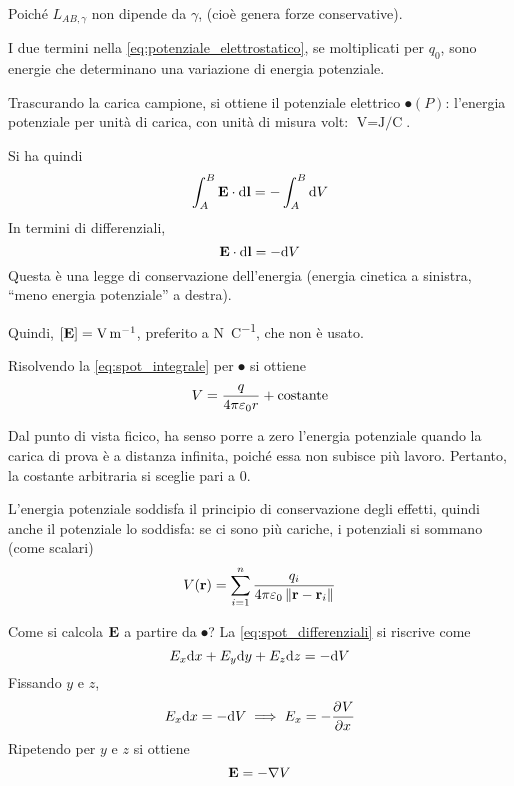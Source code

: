 Poiché $L_{AB,\gamma}$ non dipende da $\gamma$,  (cioè genera forze conservative).

I due termini nella \eqref{eq:potenziale_elettrostatico}, se moltiplicati per $q_0$, sono energie che determinano una variazione di energia potenziale.

Trascurando la carica campione, si ottiene il potenziale elettrico $\spot(P)$: l'energia potenziale per unità di carica, con unità di misura volt: $\unit{\volt} = \unit{\joule\per\coulomb}$.

Si ha quindi
\begin{equation}
\label{eq:spot_integrale}
    \int_A^B \mathbf{E} \cdot \mathrm{d} \mathbf{l} = -\int_A^B \mathrm{d} V
\end{equation}
In termini di differenziali,
\begin{equation}
\label{eq:spot_differenziali}
    \mathbf{E} \cdot \mathrm{d} \mathbf{l} = - \mathrm{d} V
\end{equation}
Questa è una legge di conservazione dell'energia (energia cinetica a sinistra, ``meno energia potenziale'' a destra).

Quindi, $[\E] = \unit{\volt\per\metre}$, preferito a \unit{\newton\per\coulomb}, che non è usato.

Risolvendo la \eqref{eq:spot_integrale} per $\spot$ si ottiene
\begin{equation}
    V = \frac{q}{4\pi \varepsilon_0 r} + \text{costante}
\end{equation}

Dal punto di vista ficico, ha senso porre a zero l'energia potenziale quando la carica di prova è a distanza infinita, poiché essa non subisce più lavoro.
Pertanto, la costante arbitraria si sceglie pari a $0$.

L'energia potenziale soddisfa il principio di conservazione degli effetti, quindi anche il potenziale lo soddisfa: se ci sono più cariche, i potenziali si sommano (come scalari)
\begin{equation}
    V(\mathbf{r}) = \sum_{i=1}^n \frac{q_i}{4\pi \varepsilon_0 \left\lVert \mathbf{r} - \mathbf{r}_i \right\rVert}
\end{equation}

Come si calcola $\mathbf{E}$ a partire da $\spot$?
La \eqref{eq:spot_differenziali} si riscrive come
\begin{equation}
    E_x \mathrm{d} x + E_y \mathrm{d} y + E_z \mathrm{d} z = - \mathrm{d} V
\end{equation}
Fissando $y$ e $z$,
\begin{equation}
    E_x \de x = - \de \spot \implies E_x = - \parder[\spot]{x}
\end{equation}
Ripetendo per $y$ e $z$ si ottiene
\begin{equation}
\label{eq:meno_grad_spot}
    \mathbf{E} = - \nabla V
\end{equation}

